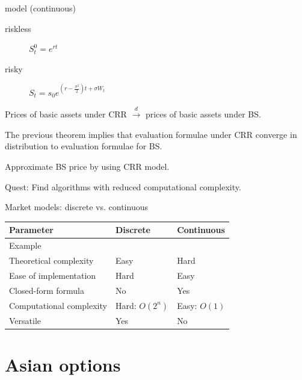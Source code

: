 \documentclass[utf8,t,compress,xcolor=svgnames,handout]{beamer}
\begin{document}
	
	\begin{frame}{\cite{Black1973} model (continuous)}
		\begin{description}
			\item[riskless] $ S_t^0 = e^{rt} $
			\item[risky] $ S_t  =  s_0 e^{ ( r - \frac{\sigma^2}{2} ) t + \sigma W_t } $
		\end{description}
		
		\begin{theorem}
			Prices of basic assets under CRR $ \xrightarrow{d} $ prices of basic assets under BS.
		\end{theorem}
		
		\begin{corollary}
			The previous theorem implies that evaluation formulae under CRR converge in distribution to evaluation formulae for BS.
		\end{corollary}
		
		\bigskip
		
		Approximate BS price by using CRR model.
		
		\bigskip
		
		\alert{Quest}: Find algorithms with reduced computational complexity.
		
	\end{frame}
	
	
	\begin{frame}{Market models: discrete vs. continuous}
		\begin{tabular}{lll}
			\toprule
			Parameter  &  Discrete  &  Continuous  \\
			\midrule
			Example  &  \cite{Cox1979}  &  \cite{Black1973}  \\
			Theoretical complexity  &  Easy  &  Hard  \\
			Ease of implementation  &  Hard  &  Easy  \\
			Closed-form formula  &  No\footnotemark  &  Yes  \\
			Computational complexity  &  Hard: $ O(2^n) $\footnotemark[1]  &  Easy: $ O(1) $  \\
			Versatile  &  Yes  &  No  \\
			\bottomrule
		\end{tabular}
	\end{frame}
	
	
	
	\section{Asian options}
	
\end{document}
